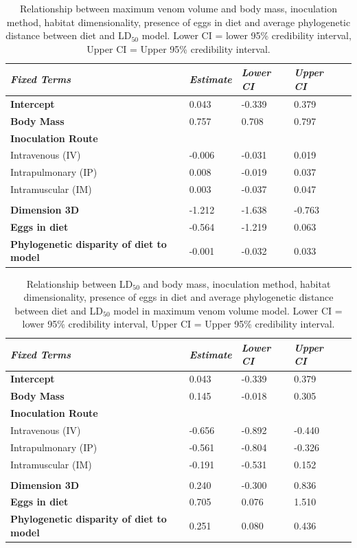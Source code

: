 \begin{table}[H]
  \centering
    \caption[ ]{Relationship between maximum venom volume and body mass, inoculation method, habitat dimensionality, presence of eggs in diet and average phylogenetic distance between diet and LD$_{50}$ model. Lower CI = lower 95\% credibility interval, Upper CI = Upper 95\% credibility interval. }
\begin{tabular}{*5l}    \toprule
\emph{Fixed Terms} & \emph{Estimate} & \emph{Lower CI} & \emph{Upper CI}\\\midrule
\textbf{Intercept} & 0.043  &  -0.339 & 0.379 \\ 
\textbf{Body Mass} & 0.757  & 0.708 & 0.797 \\ 
\textbf{Inoculation Route} &  &  &  \\ 
 Intravenous (IV) &  -0.006 &  -0.031 & 0.019 \\
 Intrapulmonary (IP) & 0.008 &  -0.019 & 0.037 \\ 
 Intramuscular (IM) & 0.003 &  -0.037 & 0.047 \\
  &  &  &  \\ 
\textbf{Dimension 3D} &  -1.212 &  -1.638 &  -0.763 \\ 
\textbf{Eggs in diet} &  -0.564 &  -1.219 & 0.063 \\ 
\textbf{Phylogenetic disparity of diet to model} &  -0.001 &  -0.032 & 0.033 \\\bottomrule
 \hline
\end{tabular}
  \label{tbl:Table 4.5.}
\end{table}



\begin{table}[H]
  \centering
    \caption[ ]{Relationship between LD$_{50}$ and body mass, inoculation method, habitat dimensionality, presence of eggs in diet and average phylogenetic distance between diet and LD$_{50}$ model in maximum venom volume model. Lower CI = lower 95\% credibility interval, Upper CI = Upper 95\% credibility interval.}
\begin{tabular}{*5l}    \toprule
\emph{Fixed Terms} & \emph{Estimate} & \emph{Lower CI} & \emph{Upper CI}\\\midrule
\textbf{Intercept} & 0.043  &  -0.339 & 0.379 \\ 
\textbf{Body Mass} & 0.145  &  -0.018 & 0.305 \\ 
\textbf{Inoculation Route} &  &  &  \\ 
 Intravenous (IV) &  -0.656 &  -0.892 &  -0.440 \\
 Intrapulmonary (IP) &  -0.561 &  -0.804 &  -0.326 \\ 
 Intramuscular (IM) &  -0.191 &  -0.531 & 0.152 \\
  &  &  &  \\ 
\textbf{Dimension 3D} & 0.240 &  -0.300 & 0.836 \\ 
\textbf{Eggs in diet} & 0.705 & 0.076 & 1.510 \\ 
\textbf{Phylogenetic disparity of diet to model} & 0.251 & 0.080 & 0.436 \\\bottomrule
 \hline
\end{tabular}
  \label{tbl:Table 4.6.}
\end{table}




